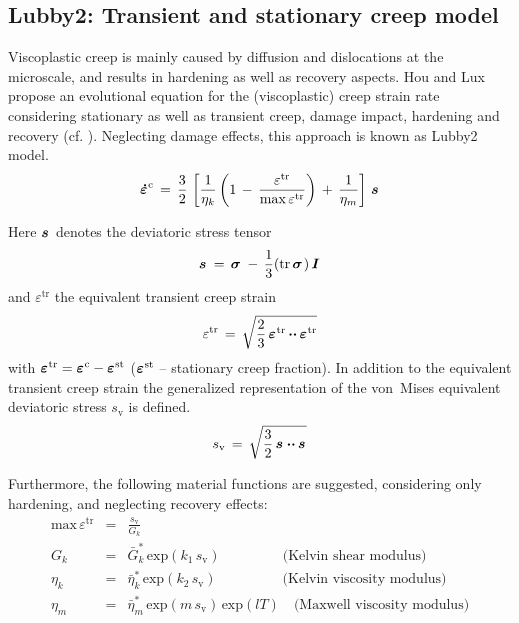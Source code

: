 
\clearpage

\subsection{Lubby2: Transient and stationary creep model}
\label{subsec:lubby2}

Viscoplastic creep is mainly caused by diffusion and dislocations at the microscale, and results in hardening as well as recovery aspects. Hou and Lux propose an evolutional equation for the (viscoplastic) creep strain rate considering stationary as well as transient creep, damage impact, hardening and recovery (cf. \cite{Hou:1997,Hou:2002,HL:1998}). Neglecting damage effects, this approach is known as Lubby2 model.
\begin{equation}
\mbox{${\mbox{\boldmath$\dot{\varepsilon}$\unboldmath}}^{\:\!\mathrm{c}}$}\,=\,
\frac{3}{2}\,
\left[
\frac{1}{\eta_k}
\left(
1\,-\,
\frac{\varepsilon^{\mathrm{tr}}}{\mathrm{max}\,\varepsilon^{\mathrm{tr}}}
\right)
\,+\,\frac{1}{\eta_m}
\right]
\,\mbox{${\mbox{\boldmath${s}$\unboldmath}}^{\:\!}$}
\label{lubby2_ec}
\end{equation}

Here $\mbox{${\mbox{\boldmath${s}$\unboldmath}}^{\:\!}$}$ denotes the deviatoric stress tensor
\begin{equation}
\mbox{${\mbox{\boldmath${s}$\unboldmath}}^{\:\!}$}\,=\,\mbox{${\mbox{\boldmath${\sigma}$\unboldmath}}^{\:\!}$}\,-\,\frac{1}{3}(\mathrm{tr}\,\mbox{${\mbox{\boldmath${\sigma}$\unboldmath}}^{\:\!}$})\,\mbox{${\mbox{\boldmath${I}$\unboldmath}}^{\:\!}$}
\end{equation}
and $\varepsilon^{\mathrm{tr}}$ the equivalent transient creep strain
\begin{equation}
\varepsilon^{\mathrm{tr}}\,=\,
\sqrt{\frac{2}{3}\,\mbox{${\mbox{\boldmath${\varepsilon}$\unboldmath}}^{\:\!\mathrm{tr}}$}\mbox{\,${\mbox{\boldmath$\cdot\cdot$\unboldmath}}$\,}\mbox{${\mbox{\boldmath${\varepsilon}$\unboldmath}}^{\:\!\mathrm{tr}}$}}
\end{equation}
with $\mbox{${\mbox{\boldmath${\varepsilon}$\unboldmath}}^{\:\!\mathrm{tr}}$}=\mbox{${\mbox{\boldmath${\varepsilon}$\unboldmath}}^{\:\!\mathrm{c}}$}-\mbox{${\mbox{\boldmath${\varepsilon}$\unboldmath}}^{\:\!\mathrm{st}}$}$ ($\mbox{${\mbox{\boldmath${\varepsilon}$\unboldmath}}^{\:\!\mathrm{st}}$}$ -- stationary creep fraction). In addition to the equivalent transient creep strain the generalized representation of the von~Mises equivalent deviatoric stress $s_{\mathrm{v}}$ is defined.
\begin{equation}
s_{\mathrm{v}}\,=\,\sqrt{\frac{3}{2}\,\mbox{${\mbox{\boldmath${s}$\unboldmath}}^{\:\!}$}\mbox{\,${\mbox{\boldmath$\cdot\cdot$\unboldmath}}$\,}\mbox{${\mbox{\boldmath${s}$\unboldmath}}^{\:\!}$}}
\end{equation}

Furthermore, the following material functions are suggested, considering only hardening, and neglecting recovery effects:
\begin{eqnarray}
\mathrm{max}\,\varepsilon^{\mathrm{tr}} & \!\!\!\!= &
\!\!\!\!\frac{s_{\mathrm{v}}}{G_k}
\\[2.0ex]
G_k & \!\!\!\!= &
\!\!\!\!{\bar G}^{\ast}_k\,\mathrm{exp}
\left(
k_1\,s_{\mathrm{v}}
\right)\;\,\qquad\qquad\mbox{(Kelvin shear modulus)}
\label{lubby2_f2}
\\[2.0ex]
\eta_k & \!\!\!\!= & \!\!\!\!{\bar\eta}^{\ast}_k\,\mathrm{exp}
\left(
k_2\,s_{\mathrm{v}}
\right)\;\;\,\qquad\qquad\mbox{(Kelvin viscosity modulus)}
\label{lubby2_f3}
\\[2.0ex]
\eta_m & \!\!\!\!= & \!\!\!\!{\bar\eta}^{\ast}_m\,\mathrm{exp}
\left(
m\,s_{\mathrm{v}}
\right)\,\mathrm{exp}(lT)\quad\mbox{(Maxwell viscosity modulus)}
\label{lubby2_f4}
\end{eqnarray}


